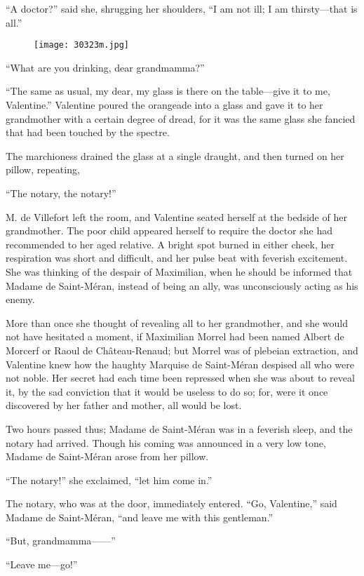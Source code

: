 “A doctor?” said she, shrugging her shoulders, “I am not ill; I am
thirsty—that is all.”

\begin{figure}[ht]
\texttt{[image: 30323m.jpg]}
\end{figure}

“What are you drinking, dear grandmamma?”

“The same as usual, my dear, my glass is there on the table—give it to
me, Valentine.” Valentine poured the orangeade into a glass and gave it
to her grandmother with a certain degree of dread, for it was the same
glass she fancied that had been touched by the spectre.

The marchioness drained the glass at a single draught, and then turned
on her pillow, repeating,

“The notary, the notary!”

M. de Villefort left the room, and Valentine seated herself at the
bedside of her grandmother. The poor child appeared herself to require
the doctor she had recommended to her aged relative. A bright spot
burned in either cheek, her respiration was short and difficult, and
her pulse beat with feverish excitement. She was thinking of the
despair of Maximilian, when he should be informed that Madame de
Saint-Méran, instead of being an ally, was unconsciously acting as his
enemy.

More than once she thought of revealing all to her grandmother, and she
would not have hesitated a moment, if Maximilian Morrel had been named
Albert de Morcerf or Raoul de Château-Renaud; but Morrel was of
plebeian extraction, and Valentine knew how the haughty Marquise de
Saint-Méran despised all who were not noble. Her secret had each time
been repressed when she was about to reveal it, by the sad conviction
that it would be useless to do so; for, were it once discovered by her
father and mother, all would be lost.

Two hours passed thus; Madame de Saint-Méran was in a feverish sleep,
and the notary had arrived. Though his coming was announced in a very
low tone, Madame de Saint-Méran arose from her pillow.

“The notary!” she exclaimed, “let him come in.”

The notary, who was at the door, immediately entered. “Go, Valentine,”
said Madame de Saint-Méran, “and leave me with this gentleman.”

“But, grandmamma——”

“Leave me—go!”


